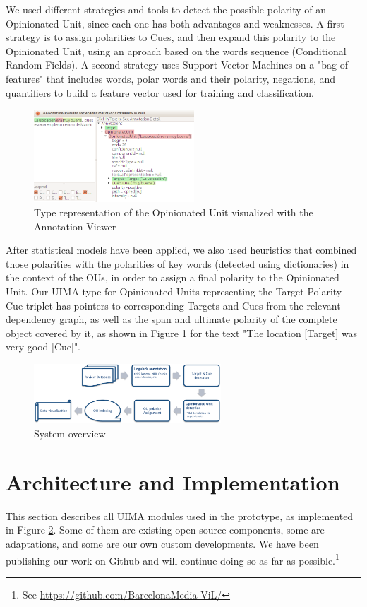 \documentclass{llncs}
\begin{document}
We used different strategies and tools to detect the possible polarity of an Opinionated Unit, since each one has both advantages and weaknesses. A first strategy is to assign polarities to Cues, and then expand this polarity to the Opinionated Unit, using an aproach based on the words sequence (Conditional Random Fields). A second strategy uses Support Vector Machines on a "bag of features" that includes words, polar words and their polarity, negations, and quantifiers to build a feature vector used for training and classification. 
\begin{figure}[ht!]
\centering
\includegraphics[width=6cm]{bookingOU.png}
\caption{Type representation of the Opinionated Unit visualized with the Annotation Viewer}
\label{fig:xmi}
\end{figure}
After statistical models have been applied, we also used heuristics that combined those polarities with the polarities of key words (detected using dictionaries) in the context of the OUs, in order to assign a final polarity to the Opinionated Unit. Our UIMA type for Opinionated Units representing the Target-Polarity-Cue triplet has pointers to corresponding Targets and Cues from the relevant dependency graph, as well as the span and ultimate polarity of the complete object covered by it, as shown in Figure \ref{fig:xmi} for the text "The location [Target] was very good [Cue]".

\begin{figure}[ht!]
\centering
\includegraphics[width=7cm]{pipelineOverview.pdf}
\caption{System overview}
\label{fig:pipeline}
\end{figure}

\section{Architecture and Implementation}

This section describes all UIMA modules used in the prototype, as implemented in Figure \ref{fig:pipeline}. Some of them are existing open source components, some are adaptations, and some are our own custom developments. We have been publishing our work on Github and will continue doing so as far as possible.\footnote{See \url{https://github.com/BarcelonaMedia-ViL/}}
\end{document}
